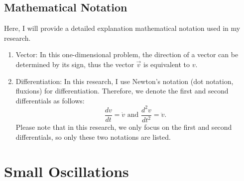 \documentclass[a4paper, reprint, showkeys, nofootinbib,twoside]{revtex4-1}
\begin{document}
        \subsection{Mathematical Notation}
        Here, I will provide a detailed explanation mathematical notation used in my research.
        \begin{enumerate}
        	\item Vector: In this one-dimensional problem, the direction of a vector can be determined by its sign, thus the vector $\vec{v}$ is equivalent to $v$.
        	\item Differentiation: In this research, I use Newton's notation (dot notation, fluxions) for differentiation. Therefore, we denote the first and second differentials as follows:
		\begin{equation}
		\frac{dv}{dt} = \dot{v} \text{ and } \frac{d^2v}{dt^2} = \ddot{v}.
		\end{equation}
		Please note that in this research, we only focus on the first and second differentials, so only these two notations are listed.
        \end{enumerate}
        \section{Small Oscillations}
\end{document}
